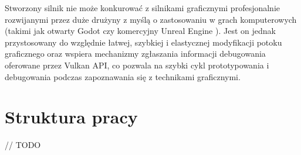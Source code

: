 Stworzony silnik nie może konkurować z silnikami graficznymi profesjonalnie rozwijanymi przez duże drużyny z myślą o zastosowaniu w grach komputerowych (takimi jak otwarty Godot \cite{godotengine} czy komercyjny Unreal Engine \cite{unrealengine}).
Jest on jednak przystosowany do względnie łatwej, szybkiej i elastycznej modyfikacji potoku graficznego oraz wspiera mechanizmy zgłaszania informacji debugowania oferowane przez Vulkan API, co pozwala na szybki cykl prototypowania i debugowania podczas zapoznawania się z technikami graficznymi.

\section{Struktura pracy}

// TODO





